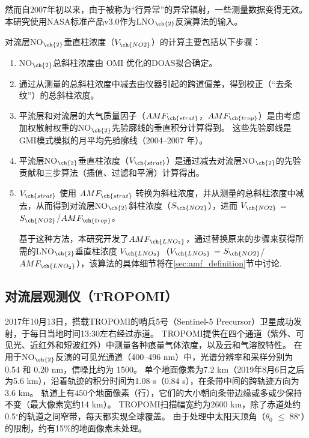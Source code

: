 然而自2007年初以来，由于被称为“行异常”的异常辐射\citep{Dobber.2008}，一些测量数据变得无效。
本研究使用NASA标准产品v3.0\citep{Krotkov.2017}作为LNO$_{\ch{2}}$反演算法的输入。

对流层NO$_{\ch{2}}$垂直柱浓度（$V_{\ch{NO2}}$）的计算主要包括以下步骤：

\begin{enumerate}[label=（\arabic*）, labelindent=\parindent, nosep, leftmargin=0pt, widest=0, itemindent=*, topsep=0pt, partopsep=0pt, parsep=0pt]

\item NO$_{\ch{2}}$总斜柱浓度由 OMI 优化的DOAS拟合确定。

\item 通过从测量的总斜柱浓度中减去由仪器引起的跨道偏差，得到校正（“去条纹”）的总斜柱浓度。

\item 平流层和对流层的大气质量因子（$AMF_{\ch{strat}}$，$AMF_{\ch{trop}}$）是由考虑加权散射权重的NO$_{\ch{2}}$先验廓线的垂直积分计算得到。
这些先验廓线是GMI模式模拟的月平均先验廓线（2004--2007 年）。

\item 平流层NO$_{\ch{2}}$垂直柱浓度（$V_{\ch{strat}}$）是通过减去对流层NO$_{\ch{2}}$的先验贡献和三步算法（插值、过滤和平滑）计算得出\citep{Bucsela.2013}。

\item $V_{\ch{strat}}$ 使用 $AMF_{\ch{strat}}$ 转换为斜柱浓度，并从测量的总斜柱浓度中减去，从而得到对流层NO$_{\ch{2}}$斜柱浓度（$S_{\ch{NO2}}$），进而 $V_{\ch{NO2}}$ = $S_{\ch{NO2}}$/$AMF_{\ch{trop}}$。

基于这种方法，本研究开发了$AMF_{\ch{LNO_2}}$，通过替换原来的步骤来获得所需的LNO$_{\ch{2}}$垂直柱浓度 $V_{\ch{LNO_2}}$（$V_{\ch{LNO_2}}$ = $S_{\ch{NO2}}$/$AMF_{\ch{LNO_2}}$），该算法的具体细节将在\ref{sec:amf_definition}节中讨论.

\end{enumerate}

\subsection{对流层观测仪（TROPOMI）}

2017年10月13日，搭载TROPOMI的哨兵5号（Sentinel-5 Precursor）卫星成功发射\citep{Veefkind.2012}，于每日当地时间13:30左右经过赤道。
TROPOMI提供在四个通道（紫外、可见光、近红外和短波红外）中测量各种痕量气体浓度，以及云和气溶胶特性。
在用于NO$_{\ch{2}}$反演的可见光通道（400–496 nm）中，光谱分辨率和采样分别为 0.54 和 0.20 nm，信噪比约为 1500。
单个地面像素为7.2 km（2019年8月6日之后为5.6 km），沿着轨迹的积分时间为1.08 s（0.84 s），在条带中间的跨轨迹方向为 3.6 km。
轨道上有450个地面像素（行），它们的大小朝向条带边缘或多或少保持不变（最大像素宽约14 km）。
TROPOMI扫描幅宽约为2600 km，除了赤道处约0.5$^{\circ}$的轨道之间窄带，每天都实现全球覆盖。
由于处理中太阳天顶角（$\theta_0$ $\leq$ 88$^{\circ}$）的限制，约有15\%的地面像素未处理。

